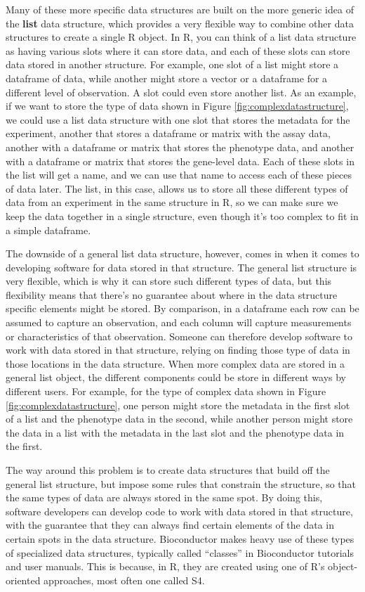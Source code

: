 \documentclass[]{tufte-book}
\begin{document}
Many of these more specific data structures are built on the more generic idea
of the \textbf{list} data structure, which provides a very flexible way to combine
other data structures to create a single R object. In R, you can think of a
list data structure as having various slots where it can store data, and
each of these slots can store data stored in another structure. For example,
one slot of a list might store a dataframe of data, while another might store
a vector or a dataframe for a different level of observation. A slot could
even store another list. As an example, if we want to store the type of
data shown in Figure \ref{fig:complexdatastructure}, we could use a list
data structure with one slot that stores the metadata for the experiment,
another that stores a dataframe or matrix with the assay data, another with a
dataframe or matrix that stores the phenotype data, and another with
a dataframe or matrix that stores the gene-level data. Each of these slots in
the list will get a name, and we can use that name to access each of these
pieces of data later. The list, in this case, allows us to store all these
different types of data from an experiment in the same structure in R, so
we can make sure we keep the data together in a single structure, even though
it's too complex to fit in a simple dataframe.

The downside of a general list data structure, however, comes in when it comes
to developing software for data stored in that structure. The general list
structure is very flexible, which is why it can store such different types of
data, but this flexibility means that there's no guarantee about where in
the data structure specific elements might be stored. By comparison, in a
dataframe each row can be assumed to capture an observation, and each column will
capture measurements or characteristics of that observation. Someone can
therefore develop software to work with data stored in that structure, relying
on finding those type of data in those locations in the data structure. When
more complex data are stored in a general list object, the different components
could be store in different ways by different users. For example, for the
type of complex data shown in Figure \ref{fig:complexdatastructure}, one person
might store the metadata in the first slot of a list and the phenotype data
in the second, while another person might store the data in a list with the
metadata in the last slot and the phenotype data in the first.

The way around this problem is to create data structures that build off the
general list structure, but impose some rules that constrain the structure, so
that the same types of data are always stored in the same spot. By doing this,
software developers can develop code to work with data stored in that structure,
with the guarantee that they can always find certain elements of the data in
certain spots in the data structure. Bioconductor makes heavy use of these
types of specialized data structures, typically called ``classes'' in Bioconductor
tutorials and user manuals. This is because, in R, they are created using
one of R's object-oriented approaches, most often one called S4.
\end{document}
